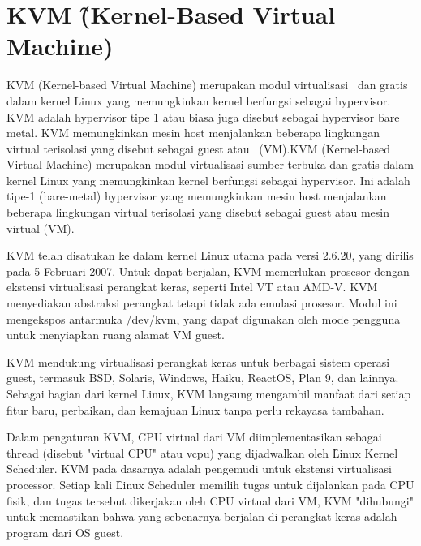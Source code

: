 \section{KVM \f{(Kernel-Based Virtual Machine)}}

\hspace{0.5cm} KVM (Kernel-based Virtual Machine) merupakan modul virtualisasi \oss\ dan gratis dalam kernel Linux yang memungkinkan kernel berfungsi sebagai hypervisor. KVM adalah hypervisor tipe 1 atau biasa juga disebut sebagai hypervisor \f{bare metal}. KVM memungkinkan mesin host menjalankan beberapa lingkungan virtual terisolasi yang disebut sebagai guest atau \vm\ (VM).KVM (Kernel-based Virtual Machine) merupakan modul virtualisasi sumber terbuka dan gratis dalam kernel Linux yang memungkinkan kernel berfungsi sebagai hypervisor. Ini adalah tipe-1 (bare-metal) hypervisor yang memungkinkan mesin host menjalankan beberapa lingkungan virtual terisolasi yang disebut sebagai guest atau mesin virtual (VM).

KVM telah disatukan ke dalam kernel Linux utama pada versi 2.6.20, yang dirilis pada 5 Februari 2007. Untuk dapat berjalan, KVM memerlukan prosesor dengan ekstensi virtualisasi perangkat keras, seperti Intel VT atau AMD-V. KVM menyediakan abstraksi perangkat tetapi tidak ada emulasi prosesor. Modul ini mengekspos antarmuka /dev/kvm, yang dapat digunakan oleh mode pengguna untuk menyiapkan ruang alamat VM guest.

KVM mendukung virtualisasi perangkat keras untuk berbagai sistem operasi guest, termasuk BSD, Solaris, Windows, Haiku, ReactOS, Plan 9, dan lainnya. Sebagai bagian dari kernel Linux, KVM langsung mengambil manfaat dari setiap fitur baru, perbaikan, dan kemajuan Linux tanpa perlu rekayasa tambahan.

Dalam pengaturan KVM, CPU virtual dari VM diimplementasikan sebagai thread (disebut "virtual CPU" atau vcpu) yang dijadwalkan oleh \f{Linux Kernel Scheduler}. KVM pada dasarnya adalah pengemudi untuk ekstensi virtualisasi processor. Setiap kali \f{Linux Scheduler} memilih tugas untuk dijalankan pada CPU fisik, dan tugas tersebut dikerjakan oleh CPU virtual dari VM, KVM "dihubungi" untuk memastikan bahwa yang sebenarnya berjalan di perangkat keras adalah program dari OS guest\cite{Abeni2020}.

